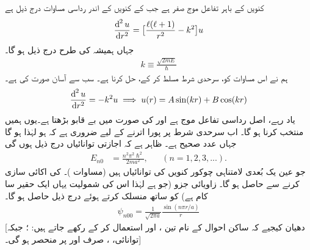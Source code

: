 \quad
کنویں کے باہر تفاعل موج صفر ہے جب کے کنویں کے اندر رداسی مساوات درج ذیل ہے
\begin{align}\label{مساوات_ابعادی_مربعی_کنواں_الف}
\frac{\dif^{\,2}u}{\dif r^{2}}=\big[\frac{\ell(\ell+1)}{r^{2}}-k^{2}\big]u 
\end{align}
جہاں ہمیشہ کی طرح درج ذیل ہو گا۔
\begin{align}
k\equiv\frac{\sqrt{2mE}}{\hslash} 
\end{align}
ہم نے اس مساوات کو، سرحدی شرط  مسلط کر کے، حل کرنا ہے۔ سب سے آسان صورت  کی ہے۔
\begin{align*}
\frac{\dif^{\,2}u}{\dif r^{2}}=-k^{2}u\implies {u(r)=A\sin(kr)+B\cos(kr)} 
\end{align*}
یاد رہے، اصل رداسی تفاعل موج  ہے اور  کی صورت میں  بے قابو بڑھتا ہے۔یوں ہمیں  منتخب کرنا ہو گا۔ اب سرحدی شرط پر پورا اترنے کے لیے ضروری ہے کہ  ہو لہٰذا  ہو گا جہاں  عدد صحیح ہے۔ ظاہر ہے کہ اجازتی توانائیاں درج ذیل ہوں گی
\begin{align}
E_{n0}&=\frac{n^{2}\pi^{2}\hslash^{2}}{2ma^{2}},&&(n=1,2,3,...). 
\end{align}
جو عین یک بُعدی لامتناہی چوکور کنویں کی توانائیاں ہیں (مساوات )۔  کی اکائی سازی کرنے سے  حاصل ہو گا۔ زاویائی جزو (جو  ہے لہٰذا اس کی شمولیت یہاں ایک حقیر سا کام ہے) کو ساتھ منسلک کرتے ہوئے درج ذیل حاصل ہو گا۔ 
\begin{align}
\psi_{n00}=\frac{1}{\sqrt{2\pi a}}\frac{\sin(n\pi r/a)}{r} 
\end{align}
[دھیان کیجیے کہ ساکن احوال کے نام تین  ،  اور  استعمال کر کے رکھے جاتے ہیں: ؛ جبکہ توانائی، ، صرف  اور  پر منحصر ہو گی۔] 

